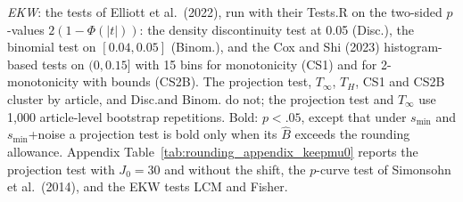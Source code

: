 \begin{table}[htbp]
\begin{minipage}{\linewidth}
\textit{EKW}: the tests of Elliott et al.\ (2022), run with their Tests.R on the two-sided $p$-values $2(1-\Phi(|t|))$: the density discontinuity test at 0.05 (Disc.), the binomial test on $[0.04,0.05]$ (Binom.), and the Cox and Shi (2023) histogram-based tests on $(0,0.15]$ with 15 bins for monotonicity (CS1) and for 2-monotonicity with bounds (CS2B).
The projection test, $T_\infty$, $T_H$, CS1 and CS2B cluster by article, and Disc.\@ and Binom. do not; the projection test and $T_\infty$ use 1,000 article-level bootstrap repetitions.
Bold: $p<.05$, except that under $s_{\min}$ and $s_{\min}$+noise a projection test is bold only when its $\widehat{B}$ exceeds the rounding allowance.
Appendix Table~\ref{tab:rounding_appendix_keepmu0} reports the projection test with $J_0=30$ and without the shift, the $p$-curve test of Simonsohn et al.\ (2014), and the EKW tests LCM and Fisher.
\end{minipage}
\end{table}
